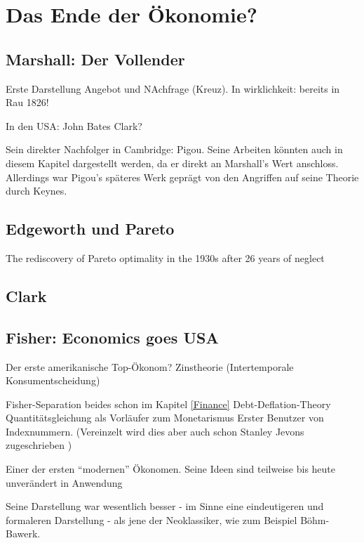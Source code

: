 %
%
%

\chapter{Das Ende der Ökonomie?}
\label{Neoklassik}

\section{Marshall: Der Vollender}

Erste Darstellung Angebot und NAchfrage (Kreuz). In wirklichkeit: bereits in Rau 1826! \textcite[S. 159]{Blaug2001}


In den USA: John Bates Clark?


Sein direkter Nachfolger in Cambridge: Pigou. Seine Arbeiten könnten auch in diesem Kapitel dargestellt werden, da er direkt an Marshall's Wert anschloss. Allerdings war Pigou's späteres Werk geprägt von den Angriffen auf seine Theorie durch Keynes. 

\section{Edgeworth und Pareto}
The rediscovery of Pareto optimality in the 1930s after
26 years of neglect \textcite[S. 148]{Blaug2001}




\section{Clark}




\section{Fisher: Economics goes USA}
Der erste amerikanische Top-Ökonom?
Zinstheorie (Intertemporale Konsumentscheidung)

Fisher-Separation
beides schon im Kapitel \ref{Finance}
Debt-Deflation-Theory
Quantitätsgleichung als Vorläufer zum Monetarismus
Erster Benutzer von Indexnummern. (Vereinzelt wird dies aber auch schon Stanley Jevons zugeschrieben \parencite[S. 232]{Jevons1934})

Einer der ersten "`modernen"' Ökonomen. Seine Ideen sind teilweise bis heute unverändert in Anwendung

Seine Darstellung war wesentlich besser - im Sinne eine eindeutigeren und formaleren Darstellung - als jene der Neoklassiker, wie zum Beispiel Böhm-Bawerk.


\textcite{Tobin2005}